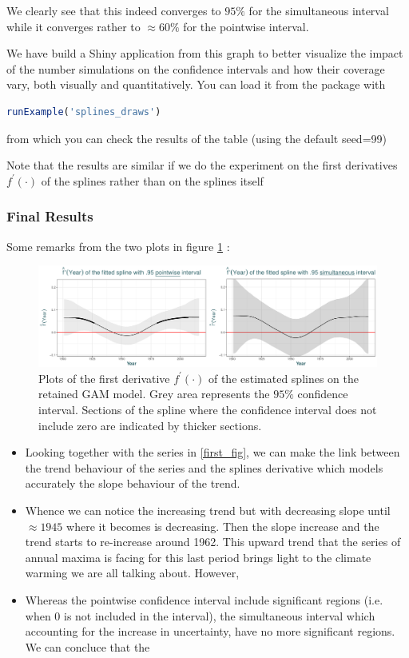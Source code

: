\documentclass[11pt,a4paper,openany ]{book}
\begin{document}
We clearly see that this indeed converges to $95\%$ for the simultaneous interval while it converges rather to $\approx 60\%$ for the pointwise interval.

We have build a Shiny application from this graph to better visualize the impact of the number simulations on the confidence intervals and how their coverage vary, both visually and quantitatively. You can load it from the package with \begin{lstlisting}[language=R]
runExample('splines_draws')\end{lstlisting} from which you can check the results of the table (using the default seed=99)

Note that the results are similar if we do the experiment on the first derivatives $f^{'}(\cdot)$ of the splines rather than on the splines itself


\subsubsection*{Final Results}


Some remarks from the two plots in figure \ref{fig:derivsplines} :

\begin{figure}[!htb]
	\includegraphics[width=.99\linewidth]{splines.pdf}\caption{Plots of the first derivative $f^{'}(\cdot)$ of the estimated splines on the retained GAM model. Grey area represents the $95\%$ confidence interval. Sections of the spline where the confidence interval does not include zero are indicated by thicker sections. }\label{fig:derivsplines}
\end{figure}

\begin{itemize}
\item Looking together with the series in \ref{first_fig}, we can make the link between the trend behaviour of the series and the splines derivative which models accurately the slope behaviour of the trend. 
\item Whence we can notice the increasing trend but with decreasing slope until $\approx 1945$ where it becomes is decreasing. Then the slope increase and the trend starts to re-increase around 1962. This upward trend that the series of annual maxima is facing for this last period brings light to the climate warming we are all talking about. However, 
\item  Whereas the pointwise confidence interval include significant regions (i.e. when 0 is not included in the interval), the simultaneous interval which accounting for the increase in uncertainty, have no more significant regions. We can concluce that the 

\end{itemize}
\end{document}

